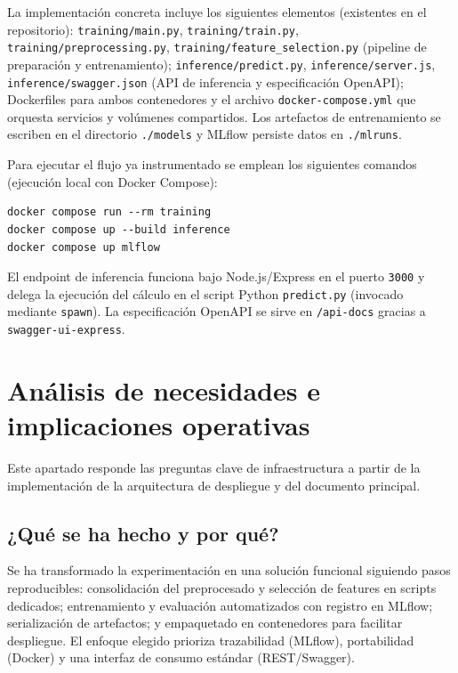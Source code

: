 \documentclass{ULBreport} %
\begin{document}
La implementación concreta incluye los siguientes elementos (existentes en el repositorio): \texttt{training/main.py}, \texttt{training/train.py}, \texttt{training/preprocessing.py}, \texttt{training/feature\_selection.py} (pipeline de preparación y entrenamiento); \texttt{inference/predict.py}, \texttt{inference/server.js}, \texttt{inference/swagger.json} (API de inferencia y especificación OpenAPI); Dockerfiles para ambos contenedores y el archivo \texttt{docker-compose.yml} que orquesta servicios y volúmenes compartidos. Los artefactos de entrenamiento se escriben en el directorio \texttt{./models} y MLflow persiste datos en \texttt{./mlruns}.

Para ejecutar el flujo ya instrumentado se emplean los siguientes comandos (ejecución local con Docker Compose):

\begin{verbatim}
docker compose run --rm training
docker compose up --build inference
docker compose up mlflow
\end{verbatim}

El endpoint de inferencia funciona bajo Node.js/Express en el puerto \texttt{3000} y delega la ejecución del cálculo en el script Python \texttt{predict.py} (invocado mediante \texttt{spawn}). La especificación OpenAPI se sirve en \texttt{/api-docs} gracias a \texttt{swagger-ui-express}.

\section{Análisis de necesidades e implicaciones operativas}

Este apartado responde las preguntas clave de infraestructura a partir de la implementación de la arquitectura de despliegue y del documento principal.

\subsection{¿Qué se ha hecho y por qué?}

Se ha transformado la experimentación en una solución funcional siguiendo pasos reproducibles: consolidación del preprocesado y selección de features en scripts dedicados; entrenamiento y evaluación automatizados con registro en MLflow; serialización de artefactos; y empaquetado en contenedores para facilitar despliegue. El enfoque elegido prioriza trazabilidad (MLflow), portabilidad (Docker) y una interfaz de consumo estándar (REST/Swagger).
\end{document}
